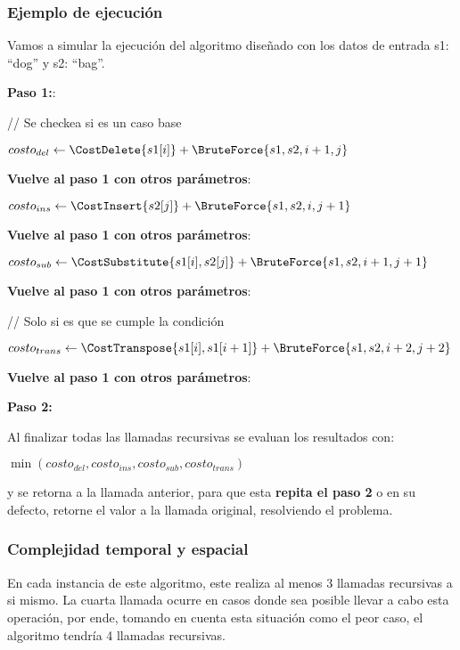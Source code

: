 \subsubsection{Ejemplo de ejecución}
Vamos a simular la ejecución del algoritmo diseñado con los datos de entrada s1: ``dog'' y s2: ``bag''.

\textbf{Paso 1:}:

// Se checkea si es un caso base

\begin{tabbing}
    $costo_{del} \leftarrow \CostDelete{s1[i]} + \BruteForce{s1, s2, i + 1, j}$\;


    \textbf{Vuelve al paso 1 con otros parámetros}:
\end{tabbing}

\begin{tabbing}
    $costo_{ins} \leftarrow \CostInsert{s2[j]} + \BruteForce{s1, s2, i, j + 1}$\;


    \textbf{Vuelve al paso 1 con otros parámetros}:
\end{tabbing}

\begin{tabbing}
    $costo_{sub} \leftarrow \CostSubstitute{s1[i], s2[j]} + \BruteForce{s1, s2, i + 1, j + 1}$\;


    \textbf{Vuelve al paso 1 con otros parámetros}:
\end{tabbing}

// Solo si es que se cumple la condición
\begin{tabbing}
    $costo_{trans} \leftarrow \CostTranspose{s1[i], s1[i+1]} + \BruteForce{s1, s2, i + 2, j + 2}$\;


    \textbf{Vuelve al paso 1 con otros parámetros}:
\end{tabbing}

\textbf{Paso 2:}

Al finalizar todas las llamadas recursivas se evaluan los resultados con:

\begin{tabbing}
    $\min(costo_{del}, costo_{ins}, costo_{sub}, costo_{trans})$
\end{tabbing}

y se retorna a la llamada anterior, para que esta \textbf{repita el paso 2} o en su defecto, retorne el valor a la llamada original, resolviendo el problema.


\subsubsection{Complejidad temporal y espacial}
En cada instancia de este algoritmo, este realiza al menos 3 llamadas recursivas a si mismo. La cuarta llamada ocurre en casos donde sea posible llevar a cabo esta operación, 
por ende, tomando en cuenta esta situación como el peor caso, el algoritmo tendría 4 llamadas recursivas. 

